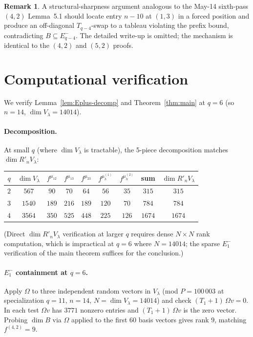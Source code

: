 \documentclass[11pt]{article}
\theoremstyle{definition}
\newtheorem{remark}[theorem]{Remark}
\newcommand{\Om}{\Omega}
\newcommand{\Rp}{{R'}}
\begin{document}
\begin{remark}\label{rem:structural-sharp}
A structural-sharpness argument analogous to the May-14 sixth-pass
$(4, 2)$ Lemma~5.1 should locate entry $n - 10$ at $(1, 3)$ in a
forced position and produce an off-diagonal $T_{q-4}$-swap to a
tableau violating the prefix bound, contradicting $B \subseteq
E_{q-4}^-$.  The detailed write-up is omitted; the mechanism is
identical to the $(4, 2)$ and $(5, 2)$ proofs.
\end{remark}

\section{Computational verification}\label{sec:verify}

We verify Lemma~\ref{lem:Eplus-decomp} and Theorem~\ref{thm:main} at
$q = 6$ (so $n = 14$, $\dim V_\lambda = 14014$).

\paragraph{Decomposition.}  At small $q$ (where $\dim V_\lambda$ is
tractable), the 5-piece decomposition matches $\dim \Rp_n V_\lambda$:
\begin{center}
\begin{tabular}{c|c|ccccc|c|c}
\toprule
$q$ & $\dim V_\lambda$ & $f^{\mu_{12}}$ & $f^{\mu_{13}}$ &
$f^{\mu_{23}}$ & $f^{\mu_h^{(1)}}$ & $f^{\mu_h^{(2)}}$ & sum &
$\dim \Rp_n V_\lambda$ \\
\midrule
$2$ & $567$  & $90$  & $70$  & $64$  & $56$  & $35$  & $315$  & $315$  \\
$3$ & $1540$ & $189$ & $216$ & $189$ & $120$ & $70$  & $784$  & $784$  \\
$4$ & $3564$ & $350$ & $525$ & $448$ & $225$ & $126$ & $1674$ & $1674$ \\
\bottomrule
\end{tabular}
\end{center}
(Direct $\dim \Rp_n V_\lambda$ verification at larger $q$ requires
dense $N \times N$ rank computation, which is impractical at $q = 6$
where $N = 14014$; the sparse $E_1^-$ verification of the
main theorem suffices for the conclusion.)

\paragraph{$E_1^-$ containment at $q = 6$.}  Apply $\Om$ to three
independent random vectors in $V_\lambda$ (mod $P = 100\,003$ at
specialization $q = 11$, $n = 14$, $N = \dim V_\lambda = 14014$) and
check $(T_1 + 1)\,\Om v = 0$.  In each test $\Om v$ has $3771$
nonzero entries and $(T_1 + 1)\,\Om v$ is the zero vector.  Probing
$\dim B$ via $\Om$ applied to the first $60$ basis vectors gives rank
$9$, matching $f^{(4, 2)} = 9$.
\end{document}

